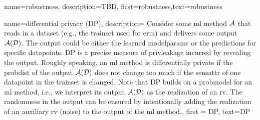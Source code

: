{name=robustness,
	description={TBD},
	first={robustness},text={robustness}
}




{name=differential privacy (DP),
  description={
  	Consider some \gls{ml} method $\mathcal{A}$ that reads in a \gls{dataset} (e.g., the \gls{trainset} 
  	used for \gls{erm}) and delivers some output $\mathcal{A}(\mathcal{D})$. The output 
  	could be either the learned \gls{modelparams} or the \gls{prediction}s for specific \gls{datapoint}s. 
  	DP is a precise measure of \gls{privleakage} incurred by revealing the 
  	output. Roughly speaking, an \gls{ml} method is differentially private if the \gls{probdist} 
  	of the output $\mathcal{A}(\mathcal{D})$ does not change too much if the \gls{sensattr} 
  	of one \gls{datapoint} in the \gls{trainset} is changed. Note that DP 
  	builds on a \gls{probmodel} for an \gls{ml} method, i.e., we interpret its output $\mathcal{A}(\mathcal{D})$ 
  	as the \gls{realization} of an \gls{rv}. The randomness in the output can be ensured 
  	by intentionally adding the \gls{realization} of an auxiliary \gls{rv} (noise) to 
  	the output of the \gls{ml} method.}, 
	first = {DP}, text={DP} 
}

